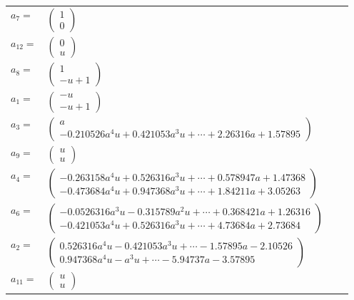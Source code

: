 \documentclass[1p]{elsarticle_modified}
\theoremstyle{definition}
\begin{document}
\begin{tabular}{m{7pt} m{180pt} m{7pt} m{180pt} }
\flushright $a_{7}=$&$\begin{pmatrix}1\\0\end{pmatrix}$ \\
\flushright $a_{12}=$&$\begin{pmatrix}0\\u\end{pmatrix}$ \\
\flushright $a_{8}=$&$\begin{pmatrix}1\\- u+1\end{pmatrix}$ \\
\flushright $a_{1}=$&$\begin{pmatrix}- u\\- u+1\end{pmatrix}$ \\
\flushright $a_{3}=$&$\begin{pmatrix}a\\-0.210526 a^{4} u+0.421053 a^{3} u+\cdots+2.26316 a+1.57895\end{pmatrix}$ \\
\flushright $a_{9}=$&$\begin{pmatrix}u\\u\end{pmatrix}$ \\
\flushright $a_{4}=$&$\begin{pmatrix}-0.263158 a^{4} u+0.526316 a^{3} u+\cdots+0.578947 a+1.47368\\-0.473684 a^{4} u+0.947368 a^{3} u+\cdots+1.84211 a+3.05263\end{pmatrix}$ \\
\flushright $a_{6}=$&$\begin{pmatrix}-0.0526316 a^{3} u-0.315789 a^{2} u+\cdots+0.368421 a+1.26316\\-0.421053 a^{4} u+0.526316 a^{3} u+\cdots+4.73684 a+2.73684\end{pmatrix}$ \\
\flushright $a_{2}=$&$\begin{pmatrix}0.526316 a^{4} u-0.421053 a^{3} u+\cdots-1.57895 a-2.10526\\0.947368 a^{4} u-a^{3} u+\cdots-5.94737 a-3.57895\end{pmatrix}$ \\
\flushright $a_{11}=$&$\begin{pmatrix}u\\u\end{pmatrix}$ \\

\end{tabular}
\end{document}
